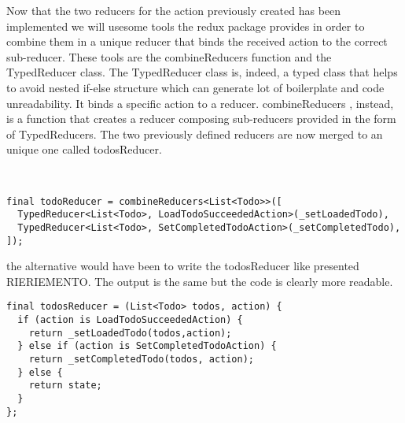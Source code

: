 Now that the two reducers for the action previously created has been implemented we will usesome tools the redux package provides in order to combine them in a unique reducer that binds the received action to the correct sub-reducer. These tools are the combineReducers function and the TypedReducer class. The TypedReducer class is, indeed, a typed class that helps to avoid nested if-else structure which can generate lot of boilerplate and code unreadability. It binds a specific action to a reducer. combineReducers , instead, is a function that creates a reducer composing sub-reducers provided in the form of TypedReducers. The two previously defined reducers are now merged to an unique one called todosReducer.
\begin{code}
\mbox{}\\
 \mbox{}
		\label{code:2.14}
\begin{verbatim}
final todoReducer = combineReducers<List<Todo>>([
  TypedReducer<List<Todo>, LoadTodoSucceededAction>(_setLoadedTodo),
  TypedReducer<List<Todo>, SetCompletedTodoAction>(_setCompletedTodo),
]);
\end{verbatim}
\mbox{}
\end{code}

the alternative would have been to write the todosReducer like presented RIERIEMENTO. The output is the same but the code is clearly more readable.
\begin{code}
\mbox{}
 \mbox{}
		\label{code:2.14}
\begin{verbatim}
final todosReducer = (List<Todo> todos, action) {
  if (action is LoadTodoSucceededAction) {
    return _setLoadedTodo(todos,action);
  } else if (action is SetCompletedTodoAction) {
    return _setCompletedTodo(todos, action);
  } else {
    return state;
  }
};
\end{verbatim}
\mbox{}
\end{code}

